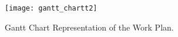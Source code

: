 


  \begin{figure}[h!]
    \centering
    \texttt{[image: gantt\_chartt2]}
    \caption{Gantt Chart Representation of the Work Plan.}
    \label{fig:gantt_chart}
  \end{figure}
  \FloatBarrier


